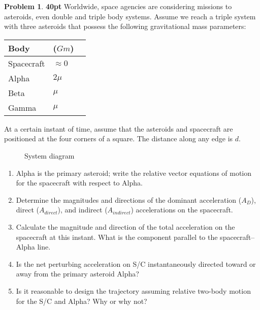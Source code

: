 \documentclass[10pt]{article}
\theoremstyle{definition}
\newtheorem{prob}{Problem}[section]
\newenvironment{subprob}%
{\renewcommand{\theenumi}{\alph{enumi}}\renewcommand{\labelenumi}{(\theenumi)}\begin{enumerate}}%
{\end{enumerate}}%
\begin{document}
\clearpage\newpage
\begin{prob}
    \textbf{40pt} Worldwide, space agencies are considering missions to asteroids, even double and triple body systems. 
    Assume we reach a triple system with three asteroids that possess the following gravitational mass parameters:

    \begin{center}
        \begin{tabular}{llr}  
            \toprule
            Body & (\( Gm\)) \\
            \midrule
            Spacecraft & \( \approx 0 \) \\
            Alpha & \( 2 \mu \) \\
            Beta & \( \mu \) \\
            Gamma & \( \mu \) \\
            \bottomrule
        \end{tabular}
    \end{center}

At a certain instant of time, assume that the asteroids and spacecraft are positioned at the four corners of a square. 
The distance along any edge is \( d\).
\begin{figure}[htbp]
    \centering
{}
\caption{System diagram}
\end{figure}

\begin{subprob}
    \item Alpha is the primary asteroid; write the relative vector equations of motion for the spacecraft with respect to Alpha.
    \item Determine the magnitudes and directions of the dominant acceleration (\(A_D\)), direct (\(A_{direct}\)), and indirect (\(A_{indirect}\)) accelerations on the spacecraft.
    \item Calculate the magnitude and direction of the total acceleration on the spacecraft at this instant. 
        What is the component parallel to the spacecraft--Alpha line.
    \item Is the net perturbing acceleration on S/C instantaneously directed toward or away from the primary asteroid Alpha?

    \item Is it reasonable to design the trajectory assuming relative two-body motion for the S/C and Alpha?
        Why or why not?
\end{subprob}
\end{prob}
\end{document}
